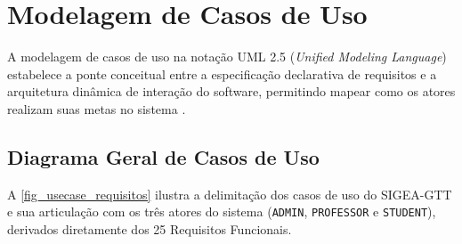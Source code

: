\chapter{Modelagem de Casos de Uso}
\label{cap_modelagem_casos_uso}

A modelagem de casos de uso na notação UML 2.5 (\textit{Unified Modeling Language}) estabelece a ponte conceitual entre a especificação declarativa de requisitos e a arquitetura dinâmica de interação do software, permitindo mapear como os atores realizam suas metas no sistema \cite{pressman2021,booch2005}.

\section{Diagrama Geral de Casos de Uso}
\label{sec_diagrama_casos_uso}

A \autoref{fig_usecase_requisitos} ilustra a delimitação dos casos de uso do SIGEA-GTT e sua articulação com os três atores do sistema (\texttt{ADMIN}, \texttt{PROFESSOR} e \texttt{STUDENT}), derivados diretamente dos 25 Requisitos Funcionais.

